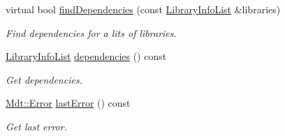\begin{DoxyCompactItemize}
virtual bool \hyperlink{class_mdt_1_1_deploy_utils_1_1_binary_dependencies_implementation_interface_accb8482907eba641b5f614b2357c7f9b}{find\+Dependencies} (const \hyperlink{class_mdt_1_1_deploy_utils_1_1_library_info_list}{Library\+Info\+List} \&libraries)
\begin{DoxyCompactList}\small\item\em Find dependencies for a lits of libraries. \end{DoxyCompactList}\item 
\hyperlink{class_mdt_1_1_deploy_utils_1_1_library_info_list}{Library\+Info\+List} \hyperlink{class_mdt_1_1_deploy_utils_1_1_binary_dependencies_implementation_interface_a2efebdcc70b6a43a23bc1908d94f4dc3}{dependencies} () const 
\begin{DoxyCompactList}\small\item\em Get dependencies. \end{DoxyCompactList}\item 
\hyperlink{class_mdt_1_1_error}{Mdt\+::\+Error} \hyperlink{class_mdt_1_1_deploy_utils_1_1_binary_dependencies_implementation_interface_a8e5a73410b12fa73a2087645cb0dc621}{last\+Error} () const 
\begin{DoxyCompactList}\small\item\em Get last error. \end{DoxyCompactList}\end{DoxyCompactItemize}
